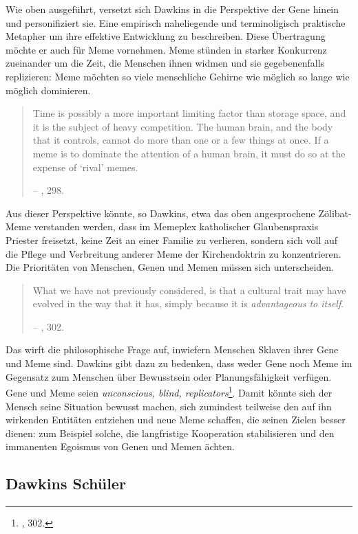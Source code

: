 \documentclass[openany,twoside,twocolumn]{book}
\let\rmarkdownfootnote\footnote%
\def\footnote{\protect\rmarkdownfootnote}
\begin{document}
Wie oben ausgeführt, versetzt sich Dawkins in die Perspektive der Gene
hinein und personifiziert sie. Eine empirisch naheliegende und
terminoligisch praktische Metapher um ihre effektive Entwicklung zu
beschreiben. Diese Übertragung möchte er auch für Meme vornehmen. Meme
stünden in starker Konkurrenz zueinander um die Zeit, die Menschen ihnen
widmen und sie gegebenenfalls replizieren: Meme möchten so viele
menschliche Gehirne wie möglich so lange wie möglich dominieren.

\begin{quote}
Time is possibly a more important limiting factor than storage space,
and it is the subject of heavy competition. The human brain, and the
body that it controls, cannot do more than one or a few things at once.
If a meme is to dominate the attention of a human brain, it must do so
at the expense of `rival' memes.

-- \textcite{Dawkinsselfishgene40th2016}, 298.
\end{quote}

Aus dieser Perspektive könnte, so Dawkins, etwa das oben angesprochene
Zölibat-Meme verstanden werden, dass im Memeplex katholischer
Glaubenspraxis Priester freisetzt, keine Zeit an einer Familie zu
verlieren, sondern sich voll auf die Pflege und Verbreitung anderer Meme
der Kirchendoktrin zu konzentrieren. Die Prioritäten von Menschen, Genen
und Memen müssen sich unterscheiden.

\begin{quote}
What we have not previously considered, is that a cultural trait may
have evolved in the way that it has, simply because it is
\emph{advantageous to itself}.

-- \textcite{Dawkinsselfishgene40th2016}, 302.
\end{quote}

Das wirft die philosophische Frage auf, inwiefern Menschen Sklaven ihrer
Gene und Meme sind. Dawkins gibt dazu zu bedenken, dass weder Gene noch
Meme im Gegensatz zum Menschen über Bewusstsein oder Planungsfähigkeit
verfügen. Gene und Meme seien \emph{unconscious, blind,
replicators}\footnote{\textcite{Dawkinsselfishgene40th2016}, 302.}.
Damit könnte sich der Mensch seine Situation bewusst machen, sich
zumindest teilweise den auf ihn wirkenden Entitäten entziehen und neue
Meme schaffen, die seinen Zielen besser dienen: zum Beispiel solche, die
langfristige Kooperation stabilisieren und den immanenten Egoismus von
Genen und Memen ächten.

\hypertarget{dawkins-schuler}{%
\subsection{Dawkins Schüler}\label{dawkins-schuler}}
\end{document}
